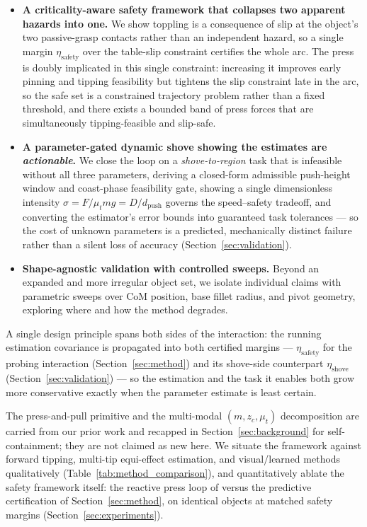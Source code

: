 \documentclass[10pt, conference]{IEEEtran}
\begin{document}
\begin{itemize}
  \item \textbf{A criticality-aware safety framework that collapses two apparent hazards into one.} We show toppling is a consequence of slip at the object's two passive-grasp contacts rather than an independent hazard, so a single margin
  $\eta_{\mathrm{safety}}$ over the table-slip constraint certifies the whole arc. The press is doubly implicated in this single constraint: increasing it improves early pinning and tipping feasibility but tightens the slip constraint late in the
  arc, so the safe set is a constrained trajectory problem rather than a fixed threshold, and there exists a bounded band of press forces that are simultaneously tipping-feasible and slip-safe.
  
  \item \textbf{A parameter-gated dynamic shove showing the estimates are  \emph{actionable}.} We close the loop on a \emph{shove-to-region} task that is  infeasible without all three parameters, deriving a closed-form admissible push-height window and coast-phase feasibility gate, showing a single dimensionless intensity $\sigma = F/\mu_t m g = D/d_{\mathrm{push}}$ governs the speed--safety tradeoff, and converting the estimator's error bounds into  guaranteed task tolerances --- so the cost of unknown parameters is a predicted, mechanically distinct failure rather than a silent loss of accuracy
  (Section~\ref{sec:validation}).
  
  \item \textbf{Shape-agnostic validation with controlled sweeps.} Beyond an expanded and more irregular object set, we isolate individual claims with parametric sweeps over CoM position, base fillet radius, and pivot geometry, exploring where and how the method degrades.
\end{itemize}

A single design principle spans both sides of the interaction: the running estimation covariance is propagated into both certified margins --- $\eta_{\mathrm{safety}}$ for the probing interaction (Section~\ref{sec:method}) and its shove-side counterpart $\eta_{\mathrm{shove}}$ (Section~\ref{sec:validation}) --- so the estimation and the task it enables both grow more conservative exactly when the parameter estimate is least certain.

The press-and-pull primitive and the multi-modal $(m, z_c, \mu_t)$ decomposition are carried from our prior work \cite{hyland_isrr} and recapped in Section~\ref{sec:background} for self-containment; they are not claimed as new here. We situate the framework against forward tipping, multi-tip equi-effect estimation, and visual/learned methods qualitatively (Table~\ref{tab:method_comparison}), and quantitatively ablate the safety framework itself: the reactive press loop of \cite{hyland_isrr} versus the predictive certification of Section~\ref{sec:method}, on identical objects at matched safety margins (Section~\ref{sec:experiments}).
\end{document}
